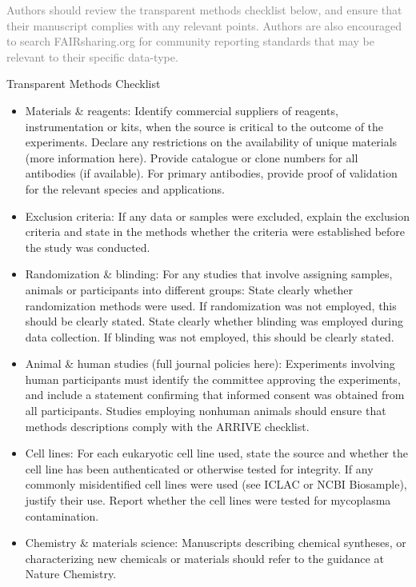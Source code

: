 \documentclass[fleqn,10pt]{wlscirep}
\begin{document}
\textcolor{gray}{Authors should review the transparent methods checklist below, and ensure that their manuscript complies with any relevant points. Authors are also encouraged to search FAIRsharing.org for community reporting standards that may be relevant to their specific data-type.}

Transparent Methods Checklist

\begin{itemize}
  \item
  Materials \& reagents:
  Identify commercial suppliers of reagents, instrumentation or kits, when the source is critical to the outcome of the experiments.
  Declare any restrictions on the availability of unique materials (more information here).
  Provide catalogue or clone numbers for all antibodies (if available). For primary antibodies, provide proof of validation for the relevant species and applications.
  
  \item
  Exclusion criteria: If any data or samples were excluded, explain the exclusion criteria and state in the methods whether the criteria were established before the study was conducted.
  
  \item
  Randomization \& blinding: For any studies that involve assigning samples, animals or participants into different groups:
  State clearly whether randomization methods were used. If randomization was not employed, this should be clearly stated.
  State clearly whether blinding was employed during data collection. If blinding was not employed, this should be clearly stated.
  
  \item
  Animal \& human studies (full journal policies here):
  Experiments involving human participants must identify the committee approving the experiments, and include a statement confirming that informed consent was obtained from all participants.
  Studies employing nonhuman animals should ensure that methods descriptions comply with the ARRIVE checklist.
  
  \item
  Cell lines:
  For each eukaryotic cell line used, state the source and whether the cell line has been authenticated or otherwise tested for integrity.
  If any commonly misidentified cell lines were used (see ICLAC or NCBI Biosample), justify their use.
  Report whether the cell lines were tested for mycoplasma contamination.
  
  \item
  Chemistry \& materials science: Manuscripts describing chemical syntheses, or characterizing new chemicals or materials should refer to the guidance at Nature Chemistry.
  
\end{itemize}
\fi
\end{document}
